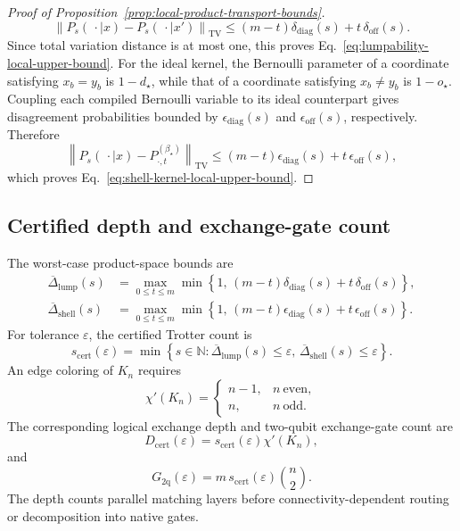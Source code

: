 \documentclass[a4paper,onecolumn,11pt,unpublished]{quantumarticle}
\theoremstyle{remark}
\begin{document}
\begin{proof}[Proof of Proposition~\ref{prop:local-product-transport-bounds}]
\[ \left\| P_s(\,\cdot\mid x) - P_s(\,\cdot\mid x') \right\|_{\mathrm{TV}} \leq (m-t)\delta_{\mathrm{diag}}(s) + t\,\delta_{\mathrm{off}}(s). \] Since total variation distance is at most one, this proves Eq.~\eqref{eq:lumpability-local-upper-bound}. For the ideal kernel, the Bernoulli parameter of a coordinate satisfying \(x_b=y_b\) is \(1-d_\star\), while that of a coordinate satisfying \(x_b\neq y_b\) is \(1-o_\star\). Coupling each compiled Bernoulli variable to its ideal counterpart gives disagreement probabilities bounded by \(\epsilon_{\mathrm{diag}}(s)\) and \(\epsilon_{\mathrm{off}}(s)\), respectively. Therefore \[ \left\| P_s(\,\cdot\mid x) - P^{(\beta_\star)}_{\cdot,t} \right\|_{\mathrm{TV}} \leq (m-t)\epsilon_{\mathrm{diag}}(s) + t\,\epsilon_{\mathrm{off}}(s), \] which proves Eq.~\eqref{eq:shell-kernel-local-upper-bound}. \end{proof} \subsection{Certified depth and exchange-gate count} The worst-case product-space bounds are \begin{align} \overline{\Delta}_{\mathrm{lump}}(s) &= \max_{0\leq t\leq m} \min\!\left\{ 1,\, (m-t)\delta_{\mathrm{diag}}(s) + t\,\delta_{\mathrm{off}}(s) \right\}, \\ \overline{\Delta}_{\mathrm{shell}}(s) &= \max_{0\leq t\leq m} \min\!\left\{ 1,\, (m-t)\epsilon_{\mathrm{diag}}(s) + t\,\epsilon_{\mathrm{off}}(s) \right\}. \end{align} For tolerance \(\varepsilon\), the certified Trotter count is \[ s_{\mathrm{cert}}(\varepsilon) = \min\left\{ s\in\mathbb N: \overline{\Delta}_{\mathrm{lump}}(s)\leq\varepsilon,\, \overline{\Delta}_{\mathrm{shell}}(s)\leq\varepsilon \right\}. \] An edge coloring of \(K_n\) requires \[ \chi'(K_n) = \begin{cases} n-1, & n\ \mathrm{even},\\ n, & n\ \mathrm{odd}. \end{cases} \] The corresponding logical exchange depth and two-qubit exchange-gate count are \begin{equation} D_{\mathrm{cert}}(\varepsilon) = s_{\mathrm{cert}}(\varepsilon)\chi'(K_n), \end{equation} and \begin{equation} G_{2\mathrm q}(\varepsilon) = m\,s_{\mathrm{cert}}(\varepsilon)\binom{n}{2}. \end{equation} The depth counts parallel matching layers before connectivity-dependent routing or decomposition into native gates. 
\end{document}

